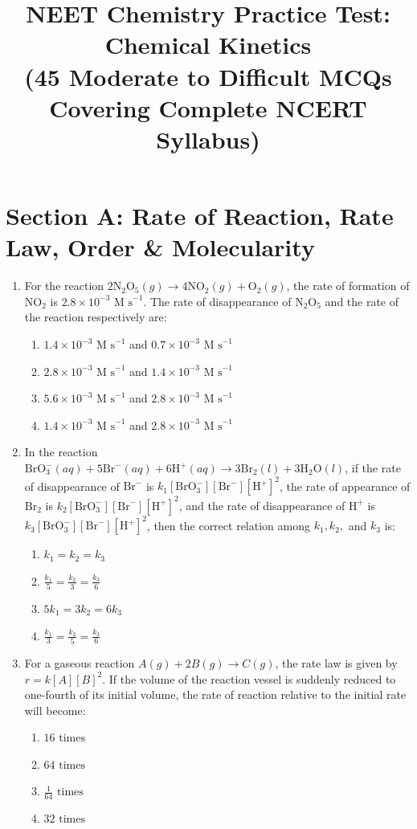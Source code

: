 \documentclass[11pt, a4paper]{article}
\title{\textbf{NEET Chemistry Practice Test: Chemical Kinetics} \\ \large (45 Moderate to Difficult MCQs Covering Complete NCERT Syllabus)}
\date{}
\begin{document}
\maketitle

\section*{Section A: Rate of Reaction, Rate Law, Order \& Molecularity}

\begin{enumerate}

\item For the reaction $2\text{N}_2\text{O}_5(g) \rightarrow 4\text{NO}_2(g) + \text{O}_2(g)$, the rate of formation of $\text{NO}_2$ is $2.8 \times 10^{-3}\text{ M s}^{-1}$. The rate of disappearance of $\text{N}_2\text{O}_5$ and the rate of the reaction respectively are:
\begin{enumerate}
    \item $1.4 \times 10^{-3}\text{ M s}^{-1}$ and $0.7 \times 10^{-3}\text{ M s}^{-1}$
    \item $2.8 \times 10^{-3}\text{ M s}^{-1}$ and $1.4 \times 10^{-3}\text{ M s}^{-1}$
    \item $5.6 \times 10^{-3}\text{ M s}^{-1}$ and $2.8 \times 10^{-3}\text{ M s}^{-1}$
    \item $1.4 \times 10^{-3}\text{ M s}^{-1}$ and $2.8 \times 10^{-3}\text{ M s}^{-1}$
\end{enumerate}

\item In the reaction $\text{BrO}_3^-(aq) + 5\text{Br}^-(aq) + 6\text{H}^+(aq) \rightarrow 3\text{Br}_2(l) + 3\text{H}_2\text{O}(l)$, if the rate of disappearance of $\text{Br}^-$ is $k_1[\text{BrO}_3^-][\text{Br}^-][\text{H}^+]^2$, the rate of appearance of $\text{Br}_2$ is $k_2[\text{BrO}_3^-][\text{Br}^-][\text{H}^+]^2$, and the rate of disappearance of $\text{H}^+$ is $k_3[\text{BrO}_3^-][\text{Br}^-][\text{H}^+]^2$, then the correct relation among $k_1, k_2,$ and $k_3$ is:
\begin{enumerate}
    \item $k_1 = k_2 = k_3$
    \item $\frac{k_1}{5} = \frac{k_2}{3} = \frac{k_3}{6}$
    \item $5k_1 = 3k_2 = 6k_3$
    \item $\frac{k_1}{3} = \frac{k_2}{5} = \frac{k_3}{6}$
\end{enumerate}

\item For a gaseous reaction $A(g) + 2B(g) \rightarrow C(g)$, the rate law is given by $r = k[A][B]^2$. If the volume of the reaction vessel is suddenly reduced to one-fourth of its initial volume, the rate of reaction relative to the initial rate will become:
\begin{enumerate}
    \item $16\text{ times}$
    \item $64\text{ times}$
    \item $\frac{1}{64}\text{ times}$
    \item $32\text{ times}$
\end{enumerate}


\end{enumerate}
\end{document}
